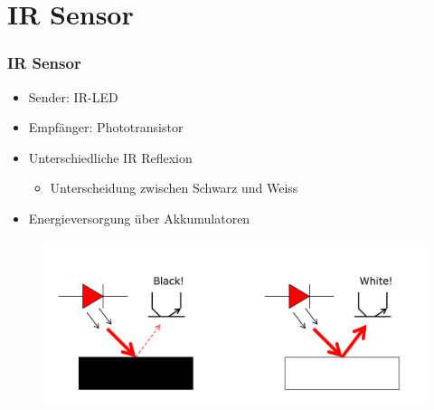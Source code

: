 \documentclass{beamer}
\begin{document}
\section{IR Sensor} %
\begin{frame}
	\frametitle{IR Sensor}
	\begin{itemize}
		\item{Sender: IR-LED}
		\item{Empfänger: Phototransistor}
		\item{Unterschiedliche IR Reflexion}
		\begin{itemize}
			\item{Unterscheidung zwischen Schwarz und Weiss}
		\end{itemize}
		\item{Energieversorgung über Akkumulatoren}
	\end{itemize}

	\begin{figure}[h!]
		\centering
		\includegraphics[width=0.6\linewidth]{figure/linefollowing_sensor_irLed_phototr.PNG}
	\end{figure}

\end{frame}
\end{document}
